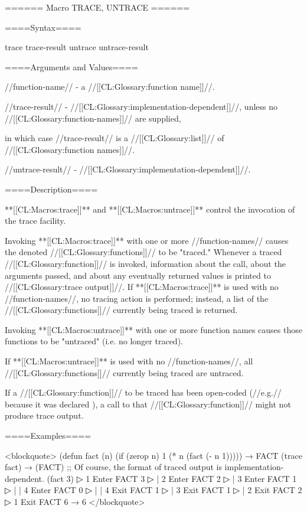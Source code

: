 ====== Macro TRACE, UNTRACE ======

====Syntax====

\DefmacWithValues trace {} {trace-result} \DefmacWithValues untrace {} {untrace-result}

====Arguments and Values====

//function-name// - a //[[CL:Glossary:function name]]//.

//trace-result// - //[[CL:Glossary:implementation-dependent]]//, unless no //[[CL:Glossary:function-names]]// are supplied,

in which case //trace-result// is a //[[CL:Glossary:list]]// of //[[CL:Glossary:function names]]//.

//untrace-result// - //[[CL:Glossary:implementation-dependent]]//.

====Description====

**[[CL:Macros:trace]]** and **[[CL:Macros:untrace]]** control the invocation of the trace facility.

Invoking **[[CL:Macros:trace]]** with one or more //function-names// causes the denoted //[[CL:Glossary:functions]]// to be "traced." Whenever a traced //[[CL:Glossary:function]]// is invoked, information about the call, about the arguments passed, and about any eventually returned values is printed to //[[CL:Glossary:trace output]]//. If **[[CL:Macros:trace]]** is used with no //function-names//, no tracing action is performed; instead, a list of the //[[CL:Glossary:functions]]// currently being traced is returned.

Invoking **[[CL:Macros:untrace]]** with one or more function names causes those functions to be "untraced" (i.e. no longer traced).

If **[[CL:Macros:untrace]]** is used with no //function-names//, all //[[CL:Glossary:functions]]// currently being traced are untraced.

If a //[[CL:Glossary:function]]// to be traced has been open-coded (//e.g.// because it was declared ), a call to that //[[CL:Glossary:function]]// might not produce trace output.

====Examples====

<blockquote> (defun fact (n) (if (zerop n) 1 (* n (fact (- n 1))))) → FACT (trace fact) → (FACT) ;; Of course, the format of traced output is implementation-dependent. (fact 3)
▷ 1 Enter FACT 3
▷ | 2 Enter FACT 2
▷ | 3 Enter FACT 1
▷ | | 4 Enter FACT 0
▷ | | 4 Exit FACT 1
▷ | 3 Exit FACT 1
▷ | 2 Exit FACT 2
▷ 1 Exit FACT 6 → 6 </blockquote>

